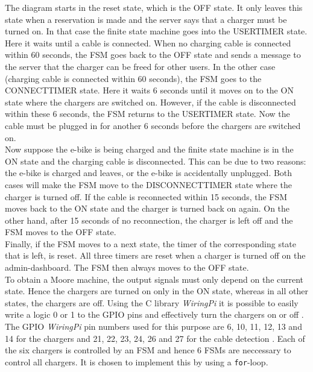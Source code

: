The diagram starts in the reset state, which is the OFF state. It only leaves this state when a reservation is made and the server says that a charger must be turned on. In that case the finite state machine goes into the USERTIMER state. Here it waits until a cable is connected. When no charging cable is connected within 60 seconds, the FSM goes back to the OFF state and sends a message to the server that the charger can be freed for other users. In the other case (charging cable is connected within 60 seconds), the FSM goes to the CONNECTTIMER state. Here it waits 6 seconds until it moves on to the ON state where the chargers are switched on. However, if the cable is disconnected within these 6 seconds, the FSM returns to the USERTIMER state. Now the cable must be plugged in for another 6 seconds before the chargers are switched on.\\

Now suppose the e-bike is being charged and the finite state machine is in the ON state and the charging cable is disconnected. This can be due to two reasons: the e-bike is charged and leaves, or the e-bike is accidentally unplugged. Both cases will make the FSM move to the DISCONNECTTIMER state where the charger is turned off. If the cable is reconnected within 15 seconds, the FSM moves back to the ON state and the charger is turned back on again. On the other hand, after 15 seconds of no reconnection, the charger is left off and the FSM moves to the OFF state.\\

Finally, if the FSM moves to a next state, the timer of the corresponding state that is left, is reset. All three timers are reset when a charger is turned off on the admin-dashboard. The FSM then always moves to the OFF state.\\

To obtain a Moore machine, the output signals must only depend on the current state. Hence the chargers are turned on only in the ON state, whereas in all other states, the chargers are off. Using the C library \textit{WiringPi} \cite{WiringPi} it is possible to easily write a logic 0 or 1 to the GPIO pins and effectively turn the chargers on or off \cite{wiringpi_functions}. The GPIO \textit{WiringPi} pin numbers used for this purpose are 6, 10, 11, 12, 13 and 14 for the chargers and 21, 22, 23, 24, 26 and 27 for the cable detection \cite{odroid_specs}. Each of the six chargers is controlled by an FSM and hence 6 FSMs are neccessary to control all chargers. It is chosen to implement this by using a \verb|for|-loop.

